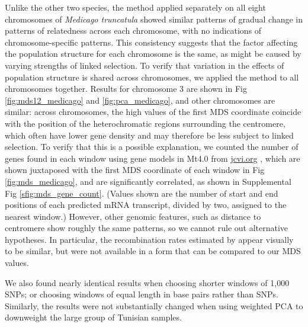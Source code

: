 \documentclass[11pt, oneside]{article}   	%
\newcommand\citet{\cite}
\newcommand\citep{\cite}
\newcommand{\Figure}{Fig }
\newcommand{\Figures}{Fig }
\newcommand{\Figure}{{Figure }}
\newcommand{\Figures}{{Figures }}
\begin{document}
Unlike the other two species,
the method applied separately on all eight chromosomes of \textit{Medicago truncatula} 
showed similar patterns of gradual change in patterns of relatedness across each chromosome,
with no indications of chromosome-specific patterns.
This consistency suggests that the factor affecting the population structure for each chromosome is the same,
as might be caused by varying strengths of linked selection.
To verify that variation in the effects of population structure is shared across chromosomes,
we applied the method to all chromosomes together.
Results for chromosome 3 are shown in \Figures \ref{fig:mds12_medicago} and \ref{fig:pca_medicago},
and other chromosomes are similar:
across chromosomes, the high values of the first MDS coordinate coincide with the position of the heterochromatic regions surrounding the centromere,
which often have lower gene density and may therefore be less subject to linked selection.
To verify that this is a possible explanation,
we counted the number of genes found in each window using gene models in Mt4.0 from \url{jcvi.org} \citep{tang2014improved},
which are shown juxtaposed with
the first MDS coordinate of each window in \Figure \ref{fig:mds_medicago},
and are significantly correlated, as shown in Supplemental \Figure \ref{sfig:mds_gene_count}.
(Values shown are the number of start and end positions of each predicted mRNA transcript,
divided by two, assigned to the nearest window.)
However, other genomic features, such as distance to centromere show roughly the same patterns,
so we cannot rule out alternative hypotheses.
In particular, the recombination rates estimated by \citet{paape2012finescale} appear visually to be similar,
but were not available in a form that can be compared to our MDS values.

We also found nearly identical results when choosing shorter windows of 1,000 SNPs;
or choosing windows of equal length in base pairs rather than SNPs.
Similarly, the results were not substantially changed
when using weighted PCA to downweight the large group of Tunisian samples.
\end{document}

